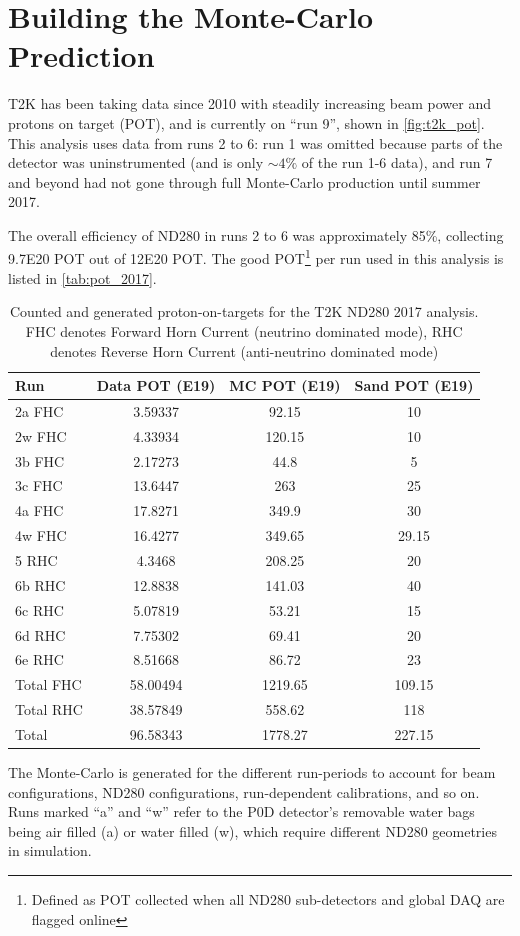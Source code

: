 \section{Building the Monte-Carlo Prediction}
T2K has been taking data since 2010 with steadily increasing beam power and protons on target (POT), and is currently on ``run 9'', shown in \autoref{fig:t2k_pot}. This analysis uses data from runs 2 to 6: run 1 was omitted because parts of the detector was uninstrumented (and is only $\sim4\%$ of the run 1-6 data), and run 7 and beyond had not gone through full Monte-Carlo production until summer 2017. 

The overall efficiency of ND280 in runs 2 to 6 was approximately 85\%, collecting 9.7E20 POT out of 12E20 POT. The good POT\footnote{Defined as POT collected when all ND280 sub-detectors and global DAQ are flagged online} per run used in this analysis is listed in \autoref{tab:pot_2017}.

\begin{table}[h]
	\centering
	\begin{tabular}{ l c c c }
		\hline
		Run & Data POT (E19) & MC POT (E19) & Sand POT (E19) \\
		\hline
		\hline
		2a  FHC & 3.59337    & 92.15       & 10 \\
		2w  FHC & 4.33934    & 120.15      & 10 \\
		\hline
		3b FHC  & 2.17273    & 44.8        & 5 \\
		3c FHC  & 13.6447    & 263         & 25 \\
		\hline
		4a FHC  & 17.8271    & 349.9       & 30 \\
		4w FHC  & 16.4277    & 349.65      & 29.15 \\
		\hline
		5 RHC & 4.3468     & 208.25      & 20 \\
		\hline
		6b RHC & 12.8838    & 141.03      & 40 \\
		6c RHC & 5.07819    & 53.21       & 15 \\
		6d RHC & 7.75302    & 69.41       & 20 \\
		6e RHC & 8.51668    & 86.72       & 23 \\
		\hline
		\hline
		Total FHC & 58.00494 & 1219.65 & 109.15\\
		Total RHC & 38.57849 & 558.62  & 118 \\
		\hline
		Total & 96.58343 & 1778.27 & 227.15 \\
		\hline
	\end{tabular}
	\caption{Counted and generated proton-on-targets for the T2K ND280 2017 analysis. FHC denotes Forward Horn Current (neutrino dominated mode), RHC denotes Reverse Horn Current (anti-neutrino dominated mode)}
	\label{tab:pot_2017}
\end{table}
The Monte-Carlo is generated for the different run-periods to account for beam configurations, ND280 configurations, run-dependent calibrations, and so on. Runs marked ``a'' and ``w'' refer to the P0D detector's removable water bags being air filled (a) or water filled (w), which require different ND280 geometries in simulation.

